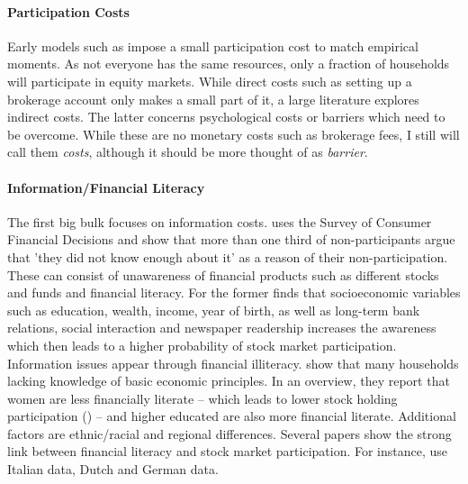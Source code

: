 \documentclass[ProjectABM]{subfiles}
\begin{document}
\paragraph{Participation Costs}
Early models such as \cite{vissing_2003, HM2003portfolio, GM2005portfolio} impose a small participation cost to match empirical moments. As not everyone has the same resources, only a fraction of households will participate in equity markets. While direct costs such as setting up a brokerage account only makes a small part of it, a large literature explores indirect costs. The latter concerns psychological costs or barriers which need to be overcome. While these are no monetary costs such as brokerage fees, I still will call them \textit{costs}, although it should be more thought of as \textit{barrier}.

\paragraph{Information/Financial Literacy}
The first big bulk focuses on information costs. \cite{king_leape_1987asset} uses the Survey of Consumer Financial Decisions and show that more than one third of non-participants argue that 'they did not know enough about it' as a reason of their non-participation. These can consist of unawareness of financial products such as different stocks and funds and financial literacy. For the former \cite{guiso_jappelli_2005} finds that socioeconomic variables such as education, wealth, income, year of birth, as well as long-term bank relations, social interaction and newspaper readership increases the awareness which then leads to a higher probability of stock market participation. Information issues appear through financial illiteracy. \cite{lusardi_mitchell_2011financial_literacy} show that many households lacking knowledge of basic economic principles. In an overview, they report that women are less financially literate -- which leads to lower stock holding participation (\cite{almenberg_2015gender}) -- and higher educated are also more financial literate. Additional factors are ethnic/racial and regional differences. Several papers show the strong link between financial literacy and stock market participation. For instance, \cite{guiso_japelli_2002household_book} use Italian data, \cite{hochguertel_et_al_2002household,vanrooij_et_al_2011} Dutch and \cite{borsch_eymann_2000household} German data.
\end{document}
